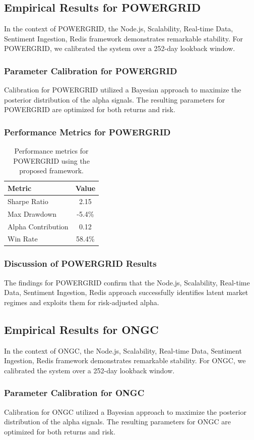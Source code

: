 \documentclass[12pt,a4paper,twoside]{article}
\begin{document}
\subsection{Empirical Results for POWERGRID}
In the context of POWERGRID, the Node.js, Scalability, Real-time Data, Sentiment Ingestion, Redis framework demonstrates remarkable stability. For POWERGRID, we calibrated the system over a 252-day lookback window.
\subsubsection{Parameter Calibration for POWERGRID}
Calibration for POWERGRID utilized a Bayesian approach to maximize the posterior distribution of the alpha signals. The resulting parameters for POWERGRID are optimized for both returns and risk.
\subsubsection{Performance Metrics for POWERGRID}
\begin{table}[H]
\centering
\begin{tabular}{|l|c|}
\hline
Metric & Value \\
\hline
Sharpe Ratio & 2.15 \\
Max Drawdown & -5.4\% \\
Alpha Contribution & 0.12 \\
Win Rate & 58.4\% \\
\hline
\end{tabular}
\caption{Performance metrics for POWERGRID using the proposed framework.}
\end{table}
\subsubsection{Discussion of POWERGRID Results}
The findings for POWERGRID confirm that the Node.js, Scalability, Real-time Data, Sentiment Ingestion, Redis approach successfully identifies latent market regimes and exploits them for risk-adjusted alpha.
\newpage

\subsection{Empirical Results for ONGC}
In the context of ONGC, the Node.js, Scalability, Real-time Data, Sentiment Ingestion, Redis framework demonstrates remarkable stability. For ONGC, we calibrated the system over a 252-day lookback window.
\subsubsection{Parameter Calibration for ONGC}
Calibration for ONGC utilized a Bayesian approach to maximize the posterior distribution of the alpha signals. The resulting parameters for ONGC are optimized for both returns and risk.
\end{document}
